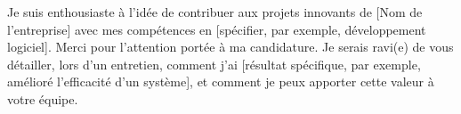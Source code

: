 Je suis enthousiaste à l’idée de contribuer aux projets innovants de [Nom de l'entreprise] avec mes compétences en [spécifier, par exemple, développement logiciel]. Merci pour l’attention portée à ma candidature. Je serais ravi(e) de vous détailler, lors d’un entretien, comment j’ai [résultat spécifique, par exemple, amélioré l’efficacité d’un système], et comment je peux apporter cette valeur à votre équipe.